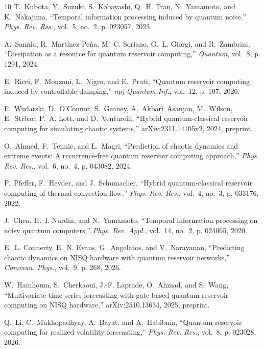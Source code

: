 \documentclass[journal]{IEEEtran}
\begin{document}
\begin{thebibliography}{10}
T.~Kubota, Y.~Suzuki, S.~Kobayashi, Q.~H. Tran, N.~Yamamoto, and K.~Nakajima,
  ``Temporal information processing induced by quantum noise,'' \emph{Phys.
  Rev. Res.}, vol.~5, no.~2, p. 023057, 2023.

A.~Sannia, R.~Mart{\'i}nez-Pe{\~n}a, M.~C. Soriano, G.~L. Giorgi, and
  R.~Zambrini, ``Dissipation as a resource for quantum reservoir computing,''
  \emph{Quantum}, vol.~8, p. 1291, 2024.

E.~Ricci, F.~Monzani, L.~Nigro, and E.~Prati, ``Quantum reservoir computing
  induced by controllable damping,'' \emph{npj Quantum Inf.}, vol.~12, p. 107,
  2026.

F.~Wudarski, D.~O'Connor, S.~Geaney, A.~Akbari~Asanjan, M.~Wilson, E.~Strbac,
  P.~A. Lott, and D.~Venturelli, ``Hybrid quantum-classical reservoir computing
  for simulating chaotic systems,'' arXiv:2311.14105v2, 2024, preprint.

O.~Ahmed, F.~Tennie, and L.~Magri, ``Prediction of chaotic dynamics and extreme
  events: A recurrence-free quantum reservoir computing approach,'' \emph{Phys.
  Rev. Res.}, vol.~6, no.~4, p. 043082, 2024.

P.~Pfeffer, F.~Heyder, and J.~Schumacher, ``Hybrid quantum-classical reservoir
  computing of thermal convection flow,'' \emph{Phys. Rev. Res.}, vol.~4,
  no.~3, p. 033176, 2022.

J.~Chen, H.~I. Nurdin, and N.~Yamamoto, ``Temporal information processing on
  noisy quantum computers,'' \emph{Phys. Rev. Appl.}, vol.~14, no.~2, p.
  024065, 2020.

E.~L. Connerty, E.~N. Evans, G.~Angelatos, and V.~Narayanan, ``Predicting
  chaotic dynamics on {NISQ} hardware with quantum reservoir networks,''
  \emph{Commun. Phys.}, vol.~9, p. 268, 2026.

W.~Hamhoum, S.~Cherkaoui, J.-F. Laprade, O.~Ahmad, and S.~Wang, ``Multivariate
  time series forecasting with gate-based quantum reservoir computing on {NISQ}
  hardware,'' arXiv:2510.13634, 2025, preprint.

Q.~Li, C.~Mukhopadhyay, A.~Bayat, and A.~Habibnia, ``Quantum reservoir
  computing for realized volatility forecasting,'' \emph{Phys. Rev. Res.},
  vol.~8, p. 023028, 2026.


\end{thebibliography}
\end{document}
